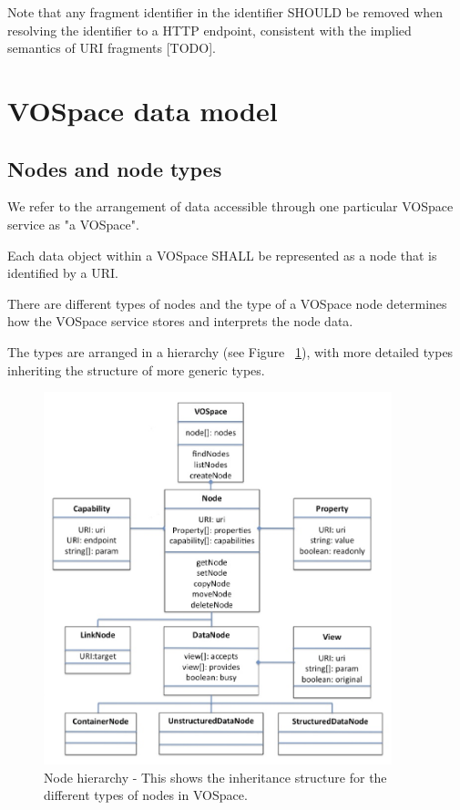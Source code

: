 \documentclass[11pt,a4paper]{ivoa}
\begin{document}
Note that any fragment identifier in the identifier SHOULD be removed when resolving the identifier to a HTTP endpoint, consistent with the implied semantics of URI fragments [TODO].

\section{VOSpace data model}
\label{sec:vospace data model}

\subsection{Nodes and node types}
\label{subsec:nodes and node types}

We refer to the arrangement of data accessible through one particular VOSpace service as "a VOSpace".

Each data object within a VOSpace SHALL be represented as a node that is identified by a URI.

There are different types of nodes and the type of a VOSpace node determines how the VOSpace service stores and interprets the node data.

The types are arranged in a hierarchy (see Figure ~\ref{fig:nodehierarchy}), with more detailed types inheriting the structure of more generic types.

\begin{figure}
\centering
\includegraphics[width=0.9\textwidth]{vospace-node-hierarchy.png}
\caption{Node hierarchy - This shows the inheritance structure for the different types of nodes in VOSpace.}
\label{fig:nodehierarchy}
\end{figure}
\end{document}

